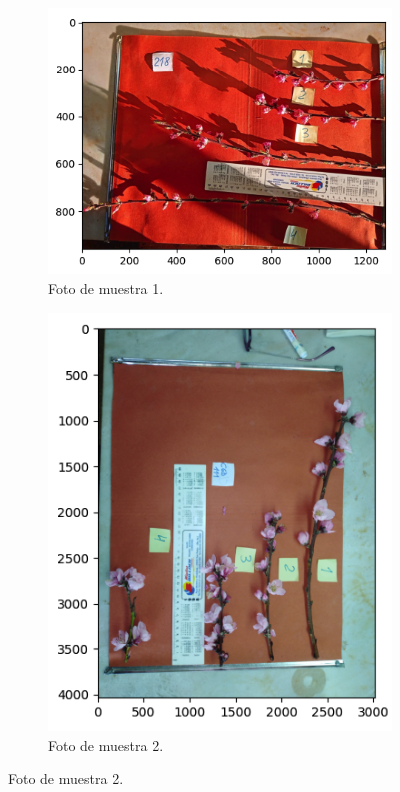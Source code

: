 \begin{figure}[!htpb]
     \centering
     \begin{subfigure}[b]{0.4\textwidth}
         \centering
         \includegraphics[scale=.4]{./Figures/flor_muestra5.png}
         \caption{Foto de muestra 1.}
         \label{fig:1de3}
     \end{subfigure}
     \hfill
     \begin{subfigure}[b]{0.4\textwidth}
         \centering
         \includegraphics[scale=.4]{./Figures/flor_muestra3.png}
         \caption{Foto de muestra 2.}
         \label{fig:2de3}

\end{subfigure}
\end{figure}
